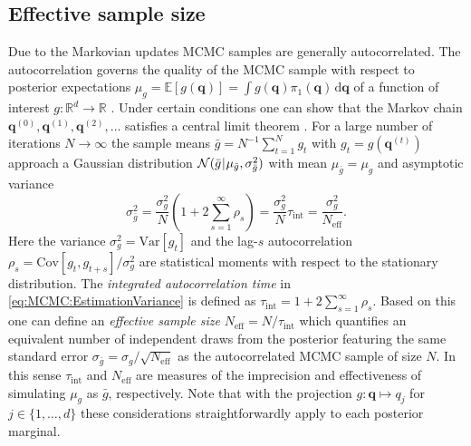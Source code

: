 \subsection{Effective sample size}
Due to the Markovian updates MCMC samples are generally autocorrelated.
The autocorrelation governs the quality of the MCMC sample with respect to posterior expectations \(\mu_g = \mathds{E}[g(\bm{q})] = \int g(\bm{q}) \pi_1(\bm{q}) \, \mathrm{d} \bm{q}\)
of a function of interest \(g \colon \mathds{R}^d \rightarrow \mathds{R}\) \cite{MCMC:Geyer1992,MCMC:Tierney1994}.
Under certain conditions one can show that the Markov chain \(\bm{q}^{(0)},\bm{q}^{(1)},\bm{q}^{(2)},\ldots\) satisfies a central limit theorem \cite{MCMC:Jones2004,MCMC:Roberts2004}.
For a large number of iterations \(N \rightarrow \infty\) the sample means \(\bar{g} = N^{-1} \sum_{t=1}^N g_t\) with \(g_t = g(\bm{q}^{(t)})\)
approach a Gaussian distribution \(\mathcal{N}(\bar{g} {\:\!}|{\:\!} \mu_{\bar{g}},\sigma^2_{\bar{g}})\) with mean \(\mu_{\bar{g}} = \mu_g\) and asymptotic variance
\begin{equation} \label{eq:MCMC:EstimationVariance}
  \sigma^2_{\bar{g}} = \frac{\sigma^2_{g}}{N} \left( 1 + 2 \sum\limits_{s=1}^{\infty} \rho_s \right) = \frac{\sigma^2_{g}}{N} \tau_{\mathrm{int}} = \frac{\sigma^2_{g}}{N_{\mathrm{eff}}}.
\end{equation}
Here the variance \(\sigma^2_{g} = \mathrm{Var}[g_t]\) and the lag-\(s\) autocorrelation \(\rho_s = \mathrm{Cov}[g_t,g_{t+s}] / \sigma^2_{g}\) are statistical moments with respect to the stationary distribution.
The \textit{integrated autocorrelation time} in \cref{eq:MCMC:EstimationVariance} is defined as \(\tau_{\mathrm{int}} = 1 + 2 \sum_{s=1}^{\infty} \rho_s\).
Based on this one can define an \textit{effective sample size} \(N_{\mathrm{eff}} = N / \tau_{\mathrm{int}}\)
which quantifies an equivalent number of independent draws from the posterior featuring the same standard error \(\sigma_{\bar{g}} = \sigma_{g} / \sqrt{N_{\mathrm{eff}}}\) as the autocorrelated MCMC sample of size \(N\).
In this sense \(\tau_{\mathrm{int}}\) and \(N_{\mathrm{eff}}\) are measures of the imprecision and effectiveness of simulating \(\mu_g\) as \(\bar{g}\), respectively.
Note that with the projection \(g \colon \bm{q} \mapsto q_j\) for \(j \in \{1,\ldots,d\}\) these considerations straightforwardly apply to each posterior marginal.

